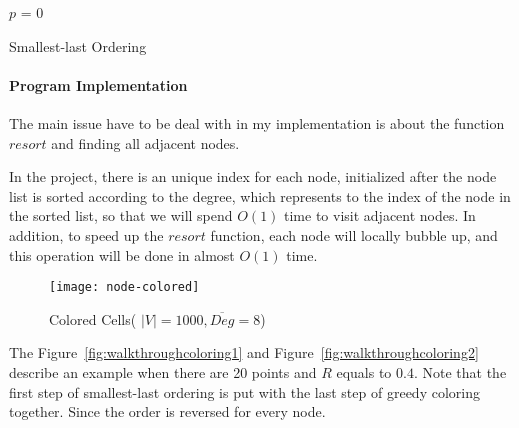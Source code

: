 \documentclass[prodmode,acmtecs]{acmsmall} %
\begin{document}
\begin{algorithm}[t]
\SetAlgoNoLine
{}
$p$ = 0\;
\caption{Smallest-last Ordering}
\label{alg:linearsmallestlast}
\end{algorithm}

\paragraph{Program Implementation}
The main issue have to be deal with in my implementation is about the function $resort$ and finding all adjacent nodes. 

In the project, there is an unique index for each node, initialized after the node list is sorted according to the degree, which represents to the index of the node in the sorted list, so that we will spend $O(1)$ time to visit adjacent nodes. In addition, to speed up the $resort$ function, each node will locally bubble up, and this operation will be done in almost $O(1)$ time.
\begin{figure}
\label{fig:colorednode}
\centerline{
    \texttt{[image: node-colored]}}
\caption{Colored Cells( $|V| = 1000, \overline{Deg} = 8$)}
\end{figure}

The Figure~\ref{fig:walkthroughcoloring1} and Figure~\ref{fig:walkthroughcoloring2} describe an example when there are 20 points and $R$ equals to $0.4$. Note that the first step of smallest-last ordering is put with the last step of greedy coloring together. Since the order is reversed for every node.
\end{document}
